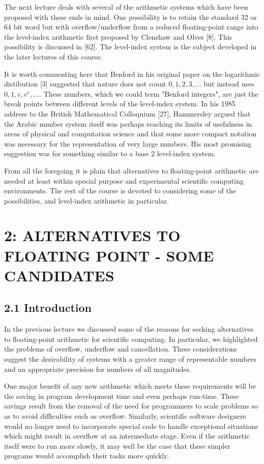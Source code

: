 \documentclass[10pt]{article}
\begin{document}
The next lecture deals with several of the arithmetic systems which have been proposed with these ends in mind. One possibility is to retain the standard 32 or 64 bit word but with overflow/underflow from a reduced floating-point range into the level-index arithmetic first proposed by Clenshaw and Olver [8]. This possibility is discussed in [62]. The level-index system is the subject developed in the later lectures of this course.

It is worth commenting here that Benford in his original paper on the logarithmic distibution [3] suggested that nature does not count $0,1,2,3, \ldots$ but instead uses $0,1, e, e^{e}, \ldots$. These numbers, which we could term "Benford integers", are just the break points between different levels of the level-index system. In his 1985 address to the British Mathematical Colloquium [27], Hammersley argued that the Arabic number system itself was perhaps reaching its limits of usefulness in areas of physical and computation science and that some more compact notation was necessary for the representation of very large numbers. His most promising suggestion was for something similar to a base 2 level-index system.

From all the foregoing it is plain that alternatives to floating-point arithmetic are needed at least within special purpose and experimental scientific computing environments. The rest of the course is devoted to considering some of the possibilities, and level-index arithmetic in particular.

\section*{2: ALTERNATIVES TO FLOATING POINT - SOME CANDIDATES }


\subsection*{2.1 Introduction}
In the previous lecture we discussed some of the reasons for seeking alternatives to floating-point arithmetic for scientific computing. In particular, we highlighted the problems of overflow, underflow and cancellation. These considerations suggest the desirability of systems with a greater range of representable numbers and an appropriate precision for numbers of all magnitudes.

One major benefit of any new arithmetic which meets these requirements will be the saving in program development time and even perhaps run-time. These savings result from the removal of the need for programmers to scale problems so as to avoid difficulties such as overflow. Similarly, scientific software designers would no longer need to incorporate special code to handle exceptional situations which might result in overflow at an intermediate stage. Even if the arithmetic itself were to run more slowly, it may well be the case that these simpler programs would accomplish their tasks more quickly.
\end{document}
